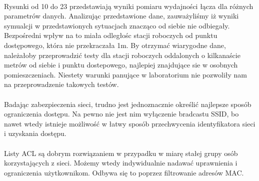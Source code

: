 \documentclass[wide,a4paper,titlepage,12pt] {article}
\begin{document}



\newpage
\paragraph{} %
\label{par:}
Rysunki od 10 do 23 przedstawiają wyniki pomiaru wydajności łącza dla różnych parametrów danych. Analizując przedstawione dane, zauważyliśmy iż wyniki symualcji w przedstawionych sytuacjach znacząco od siebie nie odbiegały. Bezpośredni wpływ na to miała odległośc stacji roboczych od punktu dostępowego, która nie przekraczała 1m. By otrzymać wiarygodne dane, należałoby przeprowadzić testy dla stacji roboczych oddalonych o kilkanaście metrów od siebie i punktu dostepowego, najlepiej znajdujące sie w osobnych pomieszczeniach. Niestety warunki panujące w laboratorium nie pozwoliły nam na przeprowadzenie takowych testów.  
\paragraph{} %
\label{par:}
Badając zabezpieczenia sieci, trudno jest jednoznacznie określić najlepsze sposób ograniczenia dostępu. Na pewno nie jest nim wyłączenie bradcastu SSID, bo nawet wtedy istnieje możliwość w łatwy sposób przechwycenia identyfikatora sieci i uzyskania dostępu.
\paragraph{} %
 \label{par:}
 Listy ACL są dobrym rozwiązaniem w przypadku w miarę stałej grupy osób korzystających z sieci. Możemy wtedy indywidualnie nadawać uprawnienia i ograniczenia użytkownikom. Odbywa się to poprzez filtrowanie adresów MAC.
\end{document}
